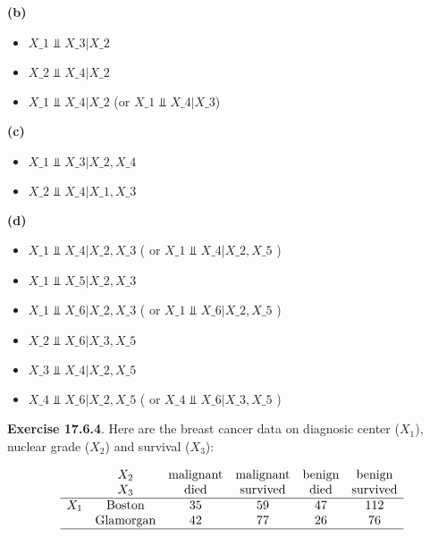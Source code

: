\textbf{(b)}

\begin{itemize}[tightlist]
\item
  $X\_{1} \text{ ⫫ } X\_{3} |{} X\_{2} $
\item
  $X\_{2} \text{ ⫫ } X\_{4} |{} X\_{2} $
\item
  $X\_{1} \text{ ⫫ } X\_{4} |{} X\_{2} $ (or $X\_{1} \text{ ⫫ } X\_{4}
  |{} X\_{3} $)
\end{itemize}

\textbf{(c)}

\begin{itemize}[tightlist]
\item
  $X\_{1} \text{ ⫫ } X\_{3} |{} X\_{2}, X\_{4} $
\item
  $X\_{2} \text{ ⫫ } X\_{4} |{} X\_{1}, X\_{3} $
\end{itemize}

\textbf{(d)}

\begin{itemize}[tightlist]
\item
  $X\_{1} \text{ ⫫ } X\_{4} |{} X\_{2}, X\_{3} $ ( or $X\_{1} \text{ ⫫ }
  X\_{4} |{} X\_{2}, X\_{5} $ )
\item
  $X\_{1} \text{ ⫫ } X\_{5} |{} X\_{2}, X\_{3} $
\item
  $X\_{1} \text{ ⫫ } X\_{6} |{} X\_{2}, X\_{3} $ ( or $X\_{1} \text{ ⫫ }
  X\_{6} |{} X\_{2}, X\_{5} $ )
\item
  $X\_{2} \text{ ⫫ } X\_{6} |{} X\_{3}, X\_{5} $
\item
  $X\_{3} \text{ ⫫ } X\_{4} |{} X\_{2}, X\_{5} $
\item
  $X\_{4} \text{ ⫫ } X\_{6} |{} X\_{2}, X\_{5} $ ( or $X\_{4} \text{ ⫫ }
  X\_{6} |{} X\_{3}, X\_{5} $ )
\end{itemize}

\textbf{Exercise 17.6.4}. Here are the breast cancer data on diagnosic
center (\(X_{1}\)), nuclear grade (\(X_{2}\)) and survival (\(X_{3}\)):

\[
\begin{array}{cccccc}
    & X_{2} & \text{malignant} & \text{malignant} & \text{benign} & \text{benign}   \\
    & X_{3} & \text{died}      & \text{survived}  & \text{died}   & \text{survived} \\
\hline
X_{1} & \text{Boston}    & 35 & 59 & 47 & 112 \\
    & \text{Glamorgan} & 42 & 77 & 26 & 76 \\
\hline
\end{array}
\]

